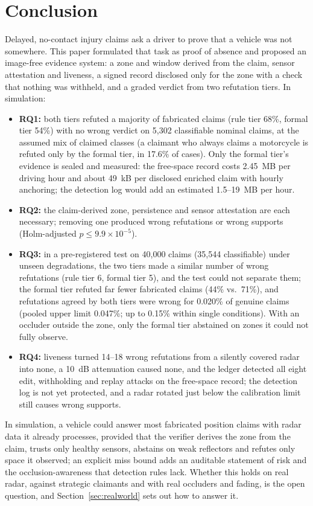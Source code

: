 \section{Conclusion}
Delayed, no-contact injury claims ask a driver to prove that a vehicle was not somewhere. This paper formulated that task as proof of absence and proposed an image-free evidence system: a zone and window derived from the claim, sensor attestation and liveness, a signed record disclosed only for the zone with a check that nothing was withheld, and a graded verdict from two refutation tiers. In simulation:
\begin{itemize}
\item \textbf{RQ1:} both tiers refuted a majority of fabricated claims (rule tier 68\%, formal tier 54\%) with no wrong verdict on 5,302 classifiable nominal claims, at the assumed mix of claimed classes (a claimant who always claims a motorcycle is refuted only by the formal tier, in 17.6\% of cases). Only the formal tier's evidence is sealed and measured: the free-space record costs 2.45~MB per driving hour and about 49~kB per disclosed enriched claim with hourly anchoring; the detection log would add an estimated 1.5--19~MB per hour.
\item \textbf{RQ2:} the claim-derived zone, persistence and sensor attestation are each necessary; removing one produced wrong refutations or wrong supports (Holm-adjusted $p \le 9.9 \times 10^{-5}$).
\item \textbf{RQ3:} in a pre-registered test on 40,000 claims (35,544 classifiable) under unseen degradations, the two tiers made a similar number of wrong refutations (rule tier 6, formal tier 5), and the test could not separate them; the formal tier refuted far fewer fabricated claims (44\% vs.\ 71\%), and refutations agreed by both tiers were wrong for 0.020\% of genuine claims (pooled upper limit 0.047\%; up to 0.15\% within single conditions). With an occluder outside the zone, only the formal tier abstained on zones it could not fully observe.
\item \textbf{RQ4:} liveness turned 14--18 wrong refutations from a silently covered radar into none, a 10~dB attenuation caused none, and the ledger detected all eight edit, withholding and replay attacks on the free-space record; the detection log is not yet protected, and a radar rotated just below the calibration limit still causes wrong supports.
\end{itemize}
In simulation, a vehicle could answer most fabricated position claims with radar data it already processes, provided that the verifier derives the zone from the claim, trusts only healthy sensors, abstains on weak reflectors and refutes only space it observed; an explicit miss bound adds an auditable statement of risk and the occlusion-awareness that detection rules lack. Whether this holds on real radar, against strategic claimants and with real occluders and fading, is the open question, and Section~\ref{sec:realworld} sets out how to answer it.

